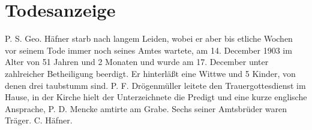 \chapter[Todesanzeige]{Todesanzeige}
P. S. Geo. Häfner starb nach langem Leiden, wobei er aber bis etliche Wochen vor seinem Tode immer noch seines Amtes wartete, am 14. December 1903 im Alter von 51 Jahren und 2 Monaten und wurde am 17. December unter zahlreicher Betheiligung beerdigt. Er hinterläßt eine Wittwe und 5 Kinder, von denen drei taubstumm sind. P. F. Drögenmüller leitete den Trauergottesdienst im Hause, in der Kirche hielt der Unterzeichnete die Predigt und eine kurze englische Ansprache, P. D. Mencke amtirte am Grabe. Sechs seiner Amtsbrüder waren Träger. C. Häfner.
